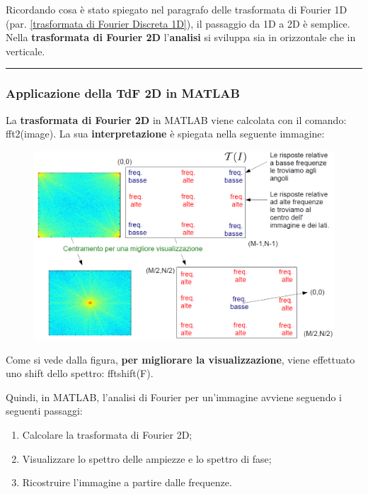 \documentclass[a4paper]{article}
\newcommand{\longline}{\noindent\rule{\textwidth}{0.4pt}}
\begin{document}
	Ricordando cosa è stato spiegato nel paragrafo delle trasformata di Fourier 1D (par. \ref{trasformata di Fourier Discreta 1D}), il passaggio da 1D a 2D è semplice. Nella \textcolor{Red3}{\textbf{trasformata di Fourier 2D}} l'\textbf{analisi} si sviluppa sia in orizzontale che in verticale.
	
	\longline
	
	\subsubsection{Applicazione della TdF 2D in MATLAB}
	
	La \textcolor{Red3}{\textbf{trasformata di Fourier 2D}} in MATLAB viene calcolata con il comando: \textsf{fft2(image)}. La sua \textbf{interpretazione} è spiegata nella seguente immagine:
	\begin{figure}[!htp]
		\centering
		\includegraphics[width=\textwidth]{img/lab/TdF-2D-1.png}
	\end{figure}
	
	\noindent
	Come si vede dalla figura, \textbf{per migliorare la visualizzazione}, viene effettuato uno shift dello spettro: \textsf{fftshift(F)}.\newline
	
	\noindent
	Quindi, in MATLAB, l'analisi di Fourier per un'immagine avviene seguendo i seguenti passaggi:
	\begin{enumerate}
		\item Calcolare la trasformata di Fourier 2D;
		
		\item Visualizzare lo spettro delle ampiezze e lo spettro di fase;
		
		\item Ricostruire l'immagine a partire dalle frequenze.
	\end{enumerate}\newpage
	
\end{document}
